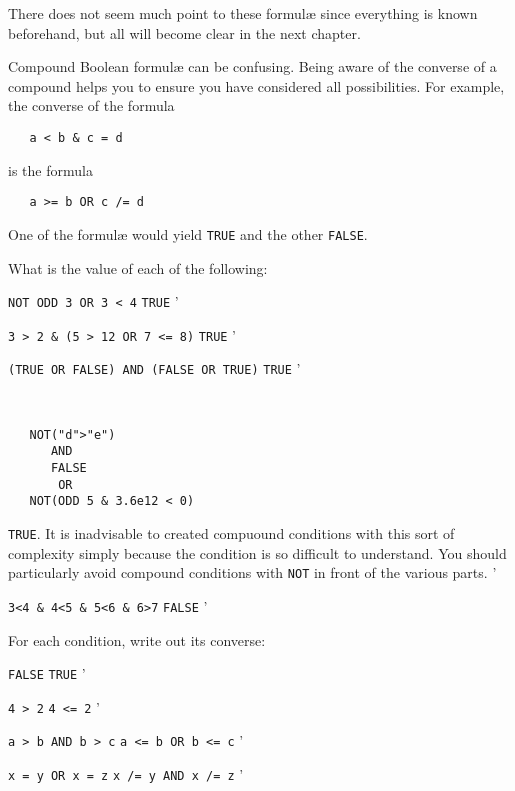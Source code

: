 There does not seem much point to these formul{\ae} since everything
is known beforehand, but all will become clear in the next chapter.

Compound Boolean formul{\ae} can be confusing. Being aware of the
converse of a compound  helps
you to ensure you have considered all possibilities. For example, the
converse of the formula
\begin{verbatim}
   a < b & c = d
\end{verbatim}
\noindent
is the formula
\begin{verbatim}
   a >= b OR c /= d
\end{verbatim}
\noindent
One of the formul{\ae} would yield \verb|TRUE| and the other
\verb|FALSE|.

\begin{exercise}
\item What is the value of each of the following:
\begin{subex}
\item \verb|NOT ODD 3 OR 3 < 4| \subans \verb|TRUE|
'
\item \verb|3 > 2 & (5 > 12 OR 7 <= 8)| \subans \verb|TRUE|
'
\item \verb|(TRUE OR FALSE) AND (FALSE OR TRUE)| \subans \verb|TRUE|
'
\item \ %
\begin{verbatim}
   NOT("d">"e")
      AND
      FALSE
       OR
   NOT(ODD 5 & 3.6e12 < 0)
\end{verbatim}
\indent\subans \verb|TRUE|. It is inadvisable to created compuound
conditions with this sort of complexity simply because the condition
is so difficult to understand. You should particularly avoid compound
conditions with \verb|NOT| in front of the various parts.
'
\item \verb|3<4 & 4<5 & 5<6 & 6>7| \subans \verb|FALSE|
'
\end{subex}
\item For each condition, write out its converse:
\begin{subex}
\item \verb|FALSE| \subans \verb|TRUE|
'
\item \verb|4 > 2| \subans \verb|4 <= 2|
'
\item \verb|a > b AND b > c| \subans \verb|a <= b OR b <= c|
'
\item \verb|x = y OR x = z| \subans \verb|x /= y AND x /= z|
'
\end{subex}
\end{exercise}

